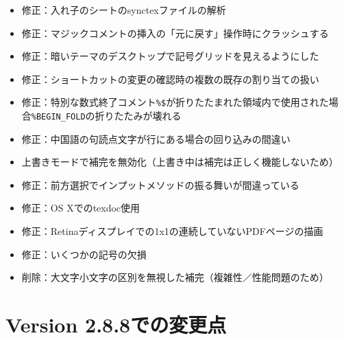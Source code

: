 \begin{itemize}
    \item
      修正：入れ子のシートのsynctexファイルの解析
    \item
      修正：マジックコメントの挿入の「元に戻す」操作時にクラッシュする
    \item
      修正：暗いテーマのデスクトップで記号グリッドを見えるようにした
    \item
      修正：ショートカットの変更の確認時の複数の既存の割り当ての扱い
    \item
      修正：特別な数式終了コメント\verb+%$+が折りたたまれた領域内で使用された場合\verb+%BEGIN_FOLD+の折りたたみが壊れる
    \item
      修正：中国語の句読点文字が行にある場合の回り込みの間違い
    \item
      上書きモードで補完を無効化（上書き中は補完は正しく機能しないため）
    \item
      修正：前方選択でインプットメソッドの振る舞いが間違っている
    \item
      修正：OS Xでのtexdoc使用
    \item
      修正：Retinaディスプレイでの1x1の連続していないPDFページの描画
    \item
      修正：いくつかの記号の欠損
    \item
      削除：大文字小文字の区別を無視した補完（複雑性／性能問題のため）
\end{itemize}

\section{Version 2.8.8での変更点}

